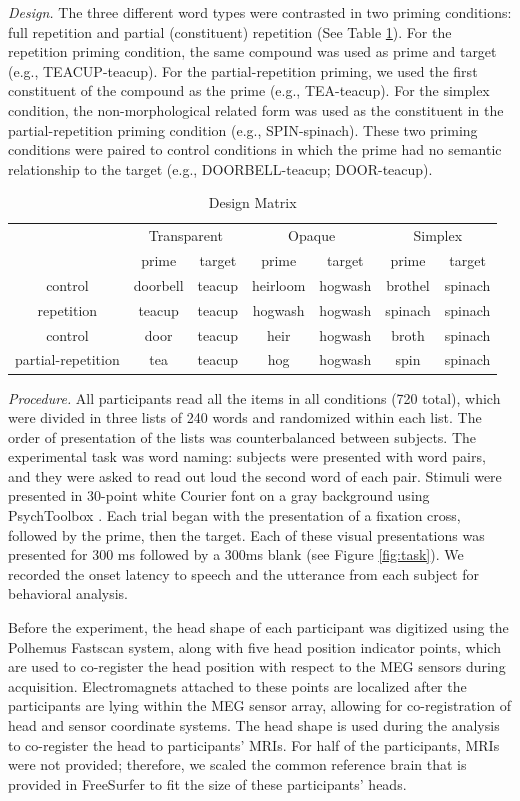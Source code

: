 \documentclass{frontiersSCNS}
\begin{document}
\textit{Design.}  The three different word types were contrasted in two priming conditions: full repetition and partial (constituent) repetition (See Table \ref{tab:Design-Matrix}).  For the repetition priming condition, the same compound was used as prime and target (e.g., TEACUP-teacup). For the partial-repetition priming, we used the first constituent of the compound as the prime (e.g., TEA-teacup). For the simplex condition, the non-morphological related form was used as the constituent in the partial-repetition priming condition (e.g., SPIN-spinach). These two priming conditions were paired to control conditions in which the prime had no semantic relationship to the target (e.g., DOORBELL-teacup; DOOR-teacup). 

\begin{table}
\begin{tabular}{|c||c|c||c|c||c|c||}
\hline 
\multicolumn{1}{|c||}{\multirow{}{}{}} & \multicolumn{2}{c||}{Transparent} & \multicolumn{2}{c||}{Opaque} & \multicolumn{2}{c||}{Simplex}\tabularnewline
\cline{2-7} 
 & prime & target & prime & target & prime & target\tabularnewline
\hline 
\hline 
control & doorbell & teacup & heirloom & hogwash & brothel & spinach\tabularnewline
\hline 
repetition & teacup & teacup & hogwash & hogwash & spinach & spinach\tabularnewline
\hline 
\hline 
control & door & teacup & heir & hogwash & broth & spinach\tabularnewline
\hline 
partial-repetition & tea & teacup & hog & hogwash & spin & spinach\tabularnewline
\hline 
\end{tabular}\caption{\label{tab:Design-Matrix} Design Matrix}
\end{table}

\textit{Procedure.} All participants read all the items in all conditions (720 total), which were divided in three lists of 240 words and randomized within each list.  The order of presentation of the lists was counterbalanced between subjects.  The experimental task was word naming: subjects were presented with word pairs, and they were asked to read out loud the second word of each pair. Stimuli were presented in 30-point white Courier font on a gray background using PsychToolbox \citep*{Brainard:1997}. Each trial began with the presentation of a fixation cross, followed by the prime, then the target. Each of these visual presentations was presented for 300 ms followed by a 300ms blank (see Figure \ref{fig:task}). We recorded the onset latency to speech and the utterance from each subject for behavioral analysis.

Before the experiment, the head shape of each participant was digitized using the Polhemus Fastscan system, along with five head position indicator points, which are used to co-register the head position with respect to the MEG sensors during acquisition.  Electromagnets attached to these points are localized after the participants are lying within the MEG sensor array, allowing for co-registration of head and sensor coordinate systems.  The head shape is used during the analysis to co-register the head to participants’ MRIs. For half of the participants, MRIs were not provided; therefore, we scaled the common reference brain that is provided in FreeSurfer to fit the size of these participants' heads.
\end{document}
